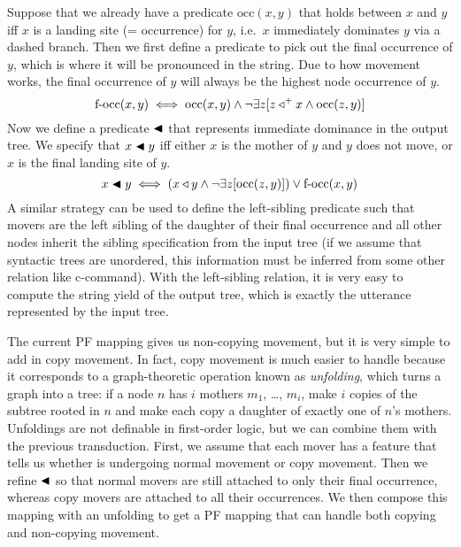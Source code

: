 \begin{examplebox}
    Suppose that we already have a predicate $\text{occ}(x,y)$ that holds between $x$ and $y$ iff $x$ is a landing site (= occurrence) for $y$, i.e.\ $x$ immediately dominates $y$ via a dashed branch.
    Then we first define a predicate to pick out the final occurrence of $y$, which is where it will be pronounced in the string.
    Due to how movement works, the final occurrence of $y$ will always be the highest node occurrence of $y$.
    \[
        \text{f-occ}(x,y) \iff
            \text{occ}(x,y) \wedge
            \neg \exists z [
                z \triangleleft^+ x \wedge \text{occ}(z,y)
                ]
    \]
    Now we define a predicate $\blacktriangleleft$ that represents immediate dominance in the output tree.
    We specify that $x \blacktriangleleft y$ iff either $x$ is the mother of $y$ and $y$ does not move, or $x$ is the final landing site of $y$.
    \[
        x \blacktriangleleft y \iff
            (
                x \triangleleft y
                \wedge
                \neg \exists z [ \text{occ}(z,y) ]
            )
            \vee
            \text{f-occ}(x,y)
    \]
    A similar strategy can be used to define the left-sibling predicate such that movers are the left sibling of the daughter of their final occurrence and all other nodes inherit the sibling specification from the input tree (if we assume that syntactic trees are unordered, this information must be inferred from some other relation like c-command).
    With the left-sibling relation, it is very easy to compute the string yield of the output tree, which is exactly the utterance represented by the input tree.
\end{examplebox}

The current PF mapping gives us non-copying movement, but it is very simple to add in copy movement.
In fact, copy movement is much easier to handle because it corresponds to a graph-theoretic operation known as \emph{unfolding}, which turns a graph into a tree: if a node $n$ has $i$ mothers $m_1$, \ldots, $m_i$, make $i$ copies of the subtree rooted in $n$ and make each copy a daughter of exactly one of $n$'s mothers.
Unfoldings are not definable in first-order logic, but we can combine them with the previous transduction.
First, we assume that each mover has a feature that tells us whether is undergoing normal movement or copy movement.
Then we refine $\blacktriangleleft$ so that normal movers are still attached to only their final occurrence, whereas copy movers are attached to all their occurrences.
We then compose this mapping with an unfolding to get a PF mapping that can handle both copying and non-copying movement.

